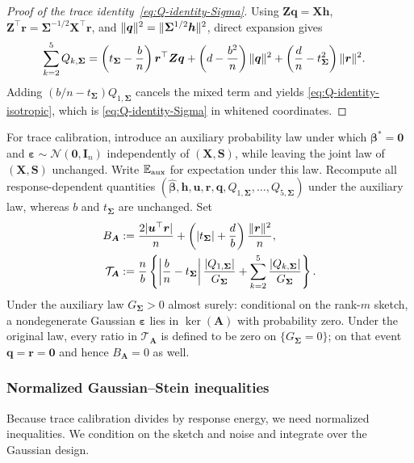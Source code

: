 \documentclass{article}
\theoremstyle{plain}
\theoremstyle{definition}
\theoremstyle{definition}
\newcommand{\boldzero}{\mathbf{0}}
\DeclarePairedDelimiter\norm{\lVert}{\rVert}
\def\E{{\mathbb{E}}}
\def\mathbold{\boldsymbol}
\def\cal{\mathcal}
\def\bA{\mathbold{A}}\def\calA{{\cal A}}\def\scrA{{\mathscr A}}\def\Ahat{\widehat{A}}\def\Atil{{\widetilde A}}
\def\bh{\mathbold{h}}\def\hhat{\widehat{h}}\def\htil{\widetilde{h}}
\def\bI{\mathbold{I}}\def\hbI{{\widehat{\bI}}}\def\tbI{{\widetilde{\bI}}}
\def\calN{{\cal N}}\def\scrN{{\mathscr N}}\def\Nhat{\widehat{N}}\def\Ntil{{\widetilde N}}\def\Nbar{{\overline N}}
\def\bq{\mathbold{q}}\def\qhat{\widehat{q}}\def\qtil{\widetilde{q}}\def\qbar{{\overline q}}
\def\br{\mathbold{r}}\def\rhat{\widehat{r}}\def\rtil{\widetilde{r}}\def\rbar{{\overline r}}
\def\bS{\mathbold{S}}\def\hbS{{\widehat{\bS}}}\def\tbS{{\widetilde{\bS}}}
\def\bu{\mathbold{u}}\def\uhat{\widehat{u}}\def\util{\widetilde{u}}\def\ubar{{\overline u}}
\def\bX{\mathbold{X}}\def\hbX{{\widehat{\bX}}}\def\tbX{{\tilde{\bX}}}\def\bXbar{{\overline \bX}}
\def\bZ{\mathbold{Z}}\def\hbZ{{\widehat{\bZ}}}\def\tbZ{{\widetilde{\bZ}}}
\def\bbeta{\mathbold{\beta}}\def\betahat{\widehat{\beta}}\def\hbeta{\widehat{\beta}}
\def\hbbeta{\hat{\bbeta}{}}
\def\ep{\varepsilon}\def\eps{\epsilon}\def\veps{\varepsilon}
\def\bep{ {\mathbold{\ep} }}
\def\bSigma{\mathbold{\Sigma}}\def\hbSigma{{\widehat{\bSigma}}}
\begin{document}
\begin{proof}[Proof of the trace identity~\eqref{eq:Q-identity-Sigma}]
Using $\bZ\bq=\bX\bh$,
$\bZ^\top\br=\bSigma^{-1/2}\bX^\top\br$, and
$\norm{\bq}^2=\norm{\bSigma^{1/2}\bh}^2$, direct expansion gives
\begin{align*}
    \sum_{k=2}^5Q_{k,\bSigma}
    &=
    \left(t_{\bSigma}-\frac bn\right)\br^\top\bZ\bq
    +\left(d-\frac{b^2}{n}\right)\norm{\bq}^2
    +\left(\frac dn-t_{\bSigma}^2\right)\norm{\br}^2.
\end{align*}
Adding $(b/n-t_{\bSigma})Q_{1,\bSigma}$ cancels the mixed term and yields
\eqref{eq:Q-identity-isotropic}, which is
\eqref{eq:Q-identity-Sigma} in whitened coordinates.
\end{proof}

For trace calibration, introduce an auxiliary probability law under which
$\bbeta^*=\boldzero$ and
$\bep\sim\calN(\boldzero,\bI_n)$ independently of $(\bX,\bS)$, while leaving
the joint law of $(\bX,\bS)$ unchanged. Write $\E_{\rm aux}$ for expectation
under this law. Recompute all response-dependent quantities
$(\hbbeta,\bh,\bu,\br,\bq,Q_{1,\bSigma},\ldots,Q_{5,\bSigma})$
under the auxiliary law, whereas $b$ and $t_{\bSigma}$ are unchanged.  Set
\begin{align*}
    B_{\bA}
    &:=\frac{2|\bu^\top\br|}{n}
      +\left(|t_{\bSigma}|+\frac{d}{b}\right)
       \frac{\norm{\br}^2}{n},\\
    \mathcal T_{\bA}
    &:=\frac{n}{b}\left\{
       \left|\frac{b}{n}-t_{\bSigma}\right|
       \frac{|Q_{1,\bSigma}|}{G_{\bSigma}}
       +\sum_{k=2}^5\frac{|Q_{k,\bSigma}|}{G_{\bSigma}}
      \right\}.
\end{align*}
Under the auxiliary law $G_{\bSigma}>0$ almost surely: conditional on
the rank-$m$ sketch, a nondegenerate Gaussian $\bep$ lies in
$\ker(\bA)$ with probability zero. Under the original
law, every ratio in $\mathcal T_{\bA}$ is defined to be zero on
$\{G_{\bSigma}=0\}$; on that event $\bq=\br=\boldzero$ and hence
$B_{\bA}=0$ as well.

\subsubsection{Normalized Gaussian--Stein inequalities}

Because trace calibration divides by response energy, we need normalized
inequalities. We condition on the sketch and noise and integrate over the
Gaussian design.
\end{document}
